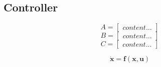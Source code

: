 \subsection{Controller}

\begin{equation}\label{key}
A=\begin{bmatrix}
content...
\end{bmatrix}
\end{equation}
\begin{equation}\label{key}
B=\begin{bmatrix}
content...
\end{bmatrix}
\end{equation}
\begin{equation}\label{key}
C=\begin{bmatrix}
content...
\end{bmatrix}
\end{equation}

\begin{equation}\label{key}
\mathbf{\dot{x}}=\textbf{f}(\mathbf{x,u})
\end{equation}




